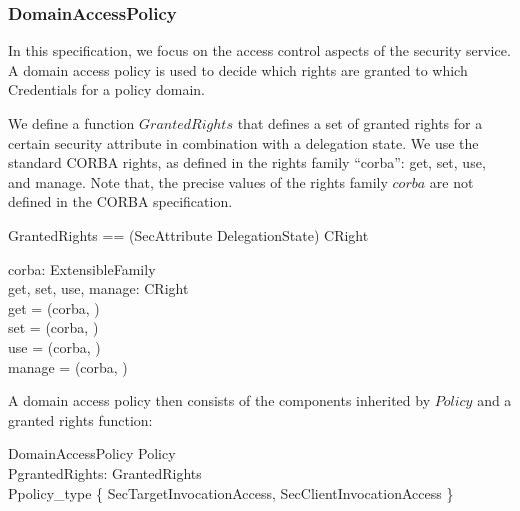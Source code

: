 \subsubsection{DomainAccessPolicy} \label{sec:DAP}
In this specification, we focus on the access control aspects of the security
service.  A domain access policy is used to decide which rights are granted to
which Credentials for a policy domain.


We define a function $GrantedRights$ that defines a set of granted rights for a
certain security attribute in combination with a delegation state.  We use the
standard CORBA rights, as defined in the rights family ``corba'': get, set, use,
and manage.  Note that, the precise values of the rights family $corba$ are not
defined in the CORBA specification.

\begin{zed}
  GrantedRights == (SecAttribute \cross DelegationState) \pfun \power CRight  
\end{zed}
     
\begin{axdef}
  corba: ExtensibleFamily \\
  get, set, use, manage: CRight \\
  \where
  get = (corba, ) \\
  set = (corba, ) \\
  use = (corba, ) \\
  manage = (corba, ) \\
\end{axdef}
A domain access policy then consists of the components inherited by $Policy$ and
a granted rights function:
\begin{schema}{DomainAccessPolicy}
  Policy \\
  PgrantedRights: GrantedRights \\
  \where
  Ppolicy\_type \in \{ SecTargetInvocationAccess, SecClientInvocationAccess \} \\
\end{schema}


